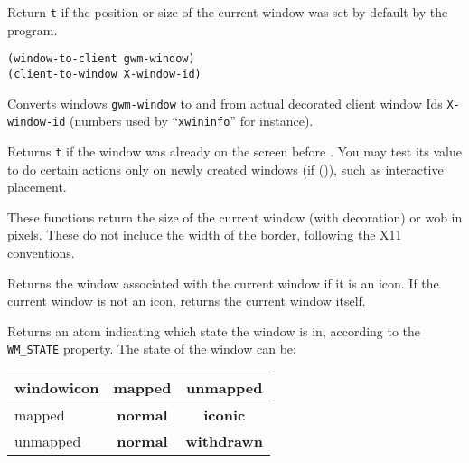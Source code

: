 
Return \verb"t" if the position or size of the current window was set
by default by the program.


{\usagefont\begin{verbatim}
(window-to-client gwm-window)
(client-to-window X-window-id)
\end{verbatim}}\usageupspace

Converts {\GWM} windows \verb|gwm-window| to and from actual decorated client
window Ids \verb|X-window-id| (numbers used by ``\verb|xwininfo|'' for
instance).

        

Returns \verb"t" if the window was already on the screen before {\GWM}.  You may test
its value to do certain actions only on newly created windows (if ()), such
as interactive placement.

        

These functions return the size of the current window (with decoration) or
wob in pixels.  These do not include the width of the border, following the
X11 conventions.

        

Returns the window associated with the current window if it is an icon. If
the current window is not an icon, returns the current window itself.


        

Returns an atom indicating which state the window is in, according to
the \verb"WM_STATE" property. The state of the window can be:

\begin{tabular}{|l|c|c|}
\hline
\vbox{\hbox{window}\hbox{icon}} & mapped & unmapped \\
\hline
mapped & {\bf normal} & {\bf iconic} \\
\hline
unmapped & {\bf normal} & {\bf withdrawn} \\
\hline
\end{tabular}

